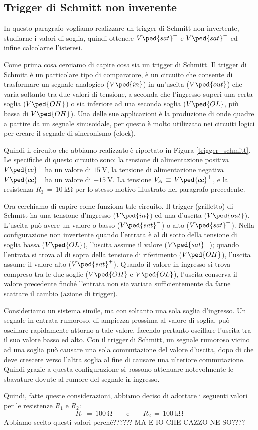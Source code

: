 \subsection*{Trigger di Schmitt non inverente}

In questo paragrafo vogliamo realizzare un trigger di Schmitt non invertente, studiarne i valori di soglia, quindi ottenere $V\ped{sat}^+$ e $V\ped{sat}^-$ ed infine calcolarne l'isteresi.

Come prima cosa cerciamo di capire cosa sia un trigger di Schmitt. Il trigger di Schmitt è un particolare tipo di comparatore, è un circuito che consente di trasformare un segnale analogico ($V\ped{in}$) in un'uscita ($V\ped{out}$) che varia soltanto tra due valori di tensione, a seconda che l'ingresso superi una certa soglia ($V\ped{OH}$) o sia inferiore ad una seconda soglia ($V\ped{OL}$, più bassa di $V\ped{OH}$). Una delle sue applicazioni è la produzione di onde quadre a partire da un segnale sinusoidale, per questo è molto utilizzato nei circuiti logici per creare il segnale di sincronismo (clock).

Quindi il circuito che abbiamo realizzato è riportato in Figura \ref{trigger_schmitt}. Le specifiche di questo circuito sono: la tensione di alimentazione positiva $V\ped{cc}^+$ ha un valore di $\SI{+15}{\volt}$, la tensione di alimentazione negativa $V\ped{cc}^-$ ha un valore di $\SI{-15}{\volt}$. La tensione $V_A\,\equiv\,V\ped{cc}^+$, e la resistenza $R_3\,=\,\SI{10}{\kilo\ohm}$ per lo stesso motivo illustrato nel paragrafo precedente. 

Ora cerchiamo di capire come funziona tale circuito. Il trigger (grilletto) di Schmitt ha una tensione d'ingresso ($V\ped{in}$) ed una d'uscita ($V\ped{out}$). L'uscita può avere un valore o basso ($V\ped{sat}^-$) o alto ($V\ped{sat}^+$).
Nella configurazione non invertente quando l'entrata è al di sotto della tensione di soglia bassa ($V\ped{OL}$), l'uscita assume il valore ($V\ped{sat}^-$); quando l'entrata si trova al di sopra della tensione di riferimento ($V\ped{OH}$), l'uscita assume il valore alto ($V\ped{sat}^+$). Quando il valore in ingresso si trova compreso tra le due soglie ($V\ped{OH}$ e $V\ped{OL}$), l'uscita conserva il valore precedente finché l'entrata non sia variata sufficientemente da farne scattare il cambio (azione di trigger).

Consideriamo un sistema simile, ma con soltanto una sola soglia d'ingresso. Un segnale in entrata rumoroso, di ampiezza prossima al valore di soglia, può oscillare rapidamente attorno a tale valore, facendo pertanto oscillare l'uscita tra il suo valore basso ed alto. Con il trigger di Schmitt, un segnale rumoroso vicino ad una soglia può causare una sola commutazione del valore d'uscita, dopo di che deve crescere verso l'altra soglia al fine di causare una ulteriore commutazione. Quindi grazie a questa configurazione si possono attenuare notevolmente le sbavature dovute al rumore del segnale in ingresso.

Quindi, fatte queste considerazioni, abbiamo deciso di adottare i seguenti valori per le resistenze $R_1$ e $R_2$:
\begin{equation}
        R_1\,=\,\SI{100}{\ohm} \qquad \text{e} \qquad R_2\,=\,\SI{100}{\kilo\ohm}
\end{equation}
Abbiamo scelto questi valori perchè?????? MA E IO CHE CAZZO NE SO????
